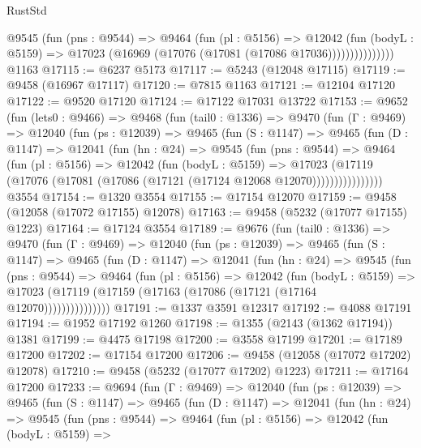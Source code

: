 \begin{lexlean}{RustStd}
\begin{coremodule}
                  @9545
                    (fun (pns : @9544) =>
                    @9464
                      (fun (pl : @5156) =>
                      @12042
                        (fun (bodyL : @5159) =>
                        @17023 (@16969 (@17076 (@17081 (@17086 @17036)))))))))))))))
    @1163
@17115 := @6237 @5173
@17117 := @5243 (@12048 @17115)
@17119 := @9458 (@16967 @17117)
@17120 := @7815 @1163
@17121 := @12104 @17120
@17122 := @9520 @17120
@17124 := @17122 @17031 @13722
@17153 := @9652
    (fun (lets0 : @9466) =>
    @9468
      (fun (tail0 : @1336) =>
      @9470
        (fun (Γ : @9469) =>
        @12040
          (fun (ps : @12039) =>
          @9465
            (fun (S : @1147) =>
            @9465
              (fun (D : @1147) =>
              @12041
                (fun (hn : @24) =>
                @9545
                  (fun (pns : @9544) =>
                  @9464
                    (fun (pl : @5156) =>
                    @12042
                      (fun (bodyL : @5159) =>
                      @17023
                        (@17119
                          (@17076 (@17081 (@17086 (@17121 (@17124 @12068 @12070))))))))))))))))
    @3554
@17154 := @1320 @3554
@17155 := @17154 @12070
@17159 := @9458 (@12058 (@17072 @17155) @12078)
@17163 := @9458 (@5232 (@17077 @17155) @1223)
@17164 := @17124 @3554
@17189 := @9676
    (fun (tail0 : @1336) =>
    @9470
      (fun (Γ : @9469) =>
      @12040
        (fun (ps : @12039) =>
        @9465
          (fun (S : @1147) =>
          @9465
            (fun (D : @1147) =>
            @12041
              (fun (hn : @24) =>
              @9545
                (fun (pns : @9544) =>
                @9464
                  (fun (pl : @5156) =>
                  @12042
                    (fun (bodyL : @5159) =>
                    @17023 (@17119 (@17159 (@17163 (@17086 (@17121 (@17164 @12070)))))))))))))))
@17191 := @1337 @3591 @12317
@17192 := @4088 @17191
@17194 := @1952 @17192 @1260
@17198 := @1355 (@2143 (@1362 @17194)) @1381
@17199 := @4475 @17198
@17200 := @3558 @17199
@17201 := @17189 @17200
@17202 := @17154 @17200
@17206 := @9458 (@12058 (@17072 @17202) @12078)
@17210 := @9458 (@5232 (@17077 @17202) @1223)
@17211 := @17164 @17200
@17233 := @9694
    (fun (Γ : @9469) =>
    @12040
      (fun (ps : @12039) =>
      @9465
        (fun (S : @1147) =>
        @9465
          (fun (D : @1147) =>
          @12041
            (fun (hn : @24) =>
            @9545
              (fun (pns : @9544) =>
              @9464
                (fun (pl : @5156) =>
                @12042
                  (fun (bodyL : @5159) =>

\end{coremodule}
\end{lexlean}
